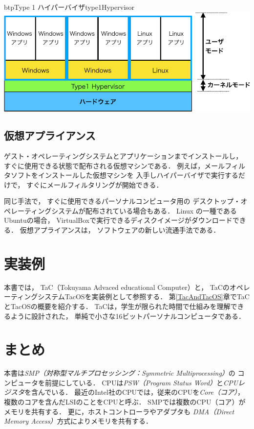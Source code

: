 \begin{myfig}{btp}{Type 1 ハイパーバイザ}{type1Hypervisor}
  \includegraphics[scale=0.66]{Fig/type1Hypervisor-crop.pdf}
\end{myfig}

\subsection{仮想アプライアンス}
ゲスト・オペレーティングシステムとアプリケーションまでインストールし，
すぐに使用できる状態で配布される仮想マシンである．
例えば，メールフィルタソフトをインストールした仮想マシンを
入手しハイパーバイザで実行するだけで，
すぐにメールフィルタリングが開始できる．

同じ手法で，
すぐに使用できるパーソナルコンピュータ用の
デスクトップ・オペレーティングシステムが配布されている場合もある．
Linux の一種であるUbuntuの場合，
VirtualBoxで実行できるディスクイメージがダウンロードできる\cite{ubuntu}．
仮想アプライアンスは，
ソフトウェアの新しい流通手法である．

\section{実装例}
本書では，
TaC（Tokuyama Advaced educational Computer）と，
TaCのオペレーティングシステムTacOSを実装例として参照する．
第\ref{TacAndTacOS}章でTaCとTacOSの概要を紹介する．
TaCは，学生が限られた時間で仕組みを理解できるように設計された，
単純で小さな16ビットパーソナルコンピュータである．

\section{まとめ}
本書は\emph{SMP（対称型マルチプロセッシング：Symmetric Multiprocessing）}の
コンピュータを前提にしている．
CPUは\emph{PSW（Program Status Word）}と\emph{CPUレジスタ}を含んでいる．
最近のIntel社のCPUでは，従来のCPUを\emph{Core（コア）}，
複数のコアを含んだLSIのことをCPUと呼ぶ．
SMPでは複数のCPU（コア）がメモリを共有する．
更に，ホストコントローラやアダプタも
\emph{DMA（Direct Memory Access）}方式によりメモリを共有する．

